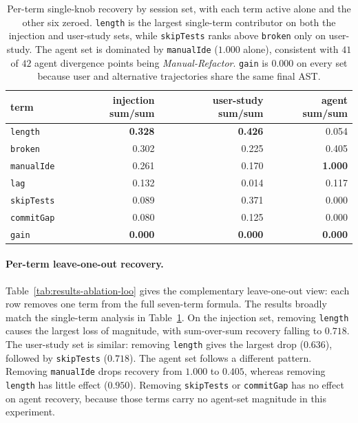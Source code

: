 \begin{table}[htbp]
\centering
\small
\begin{tabular}{lrrr}
\hline
\textbf{term} & \textbf{injection sum/sum} & \textbf{user-study sum/sum} & \textbf{agent sum/sum} \\
\hline
\texttt{length}    & \textbf{0.328} & \textbf{0.426} & 0.054          \\
\texttt{broken}    & 0.302          & 0.225          & 0.405          \\
\texttt{manualIde} & 0.261          & 0.170          & \textbf{1.000} \\
\texttt{lag}       & 0.132          & 0.014          & 0.117          \\
\texttt{skipTests} & 0.089          & 0.371          & 0.000          \\
\texttt{commitGap} & 0.080          & 0.125          & 0.000          \\
\texttt{gain}      & \textbf{0.000} & \textbf{0.000} & \textbf{0.000} \\
\hline
\end{tabular}
\caption{Per-term single-knob recovery by session set, with each term active alone and the other six zeroed. \texttt{length} is the largest single-term contributor on both the injection and user-study sets, while \texttt{skipTests} ranks above \texttt{broken} only on user-study. The agent set is dominated by \texttt{manualIde} ($1.000$ alone), consistent with $41$ of $42$ agent divergence points being \emph{Manual-Refactor}. \texttt{gain} is $0.000$ on every set because user and alternative trajectories share the same final AST.}
\label{tab:results-ablation-solo}
\end{table}

\paragraph{Per-term leave-one-out recovery.}
Table~\ref{tab:results-ablation-loo} gives the complementary leave-one-out view: each row removes one term from the full seven-term formula. The results broadly match the single-term analysis in Table~\ref{tab:results-ablation-solo}. On the injection set, removing \texttt{length} causes the largest loss of magnitude, with sum-over-sum recovery falling to $0.718$. The user-study set is similar: removing \texttt{length} gives the largest drop ($0.636$), followed by \texttt{skipTests} ($0.718$). The agent set follows a different pattern. Removing \texttt{manualIde} drops recovery from $1.000$ to $0.405$, whereas removing \texttt{length} has little effect ($0.950$). Removing \texttt{skipTests} or \texttt{commitGap} has no effect on agent recovery, because those terms carry no agent-set magnitude in this experiment.

